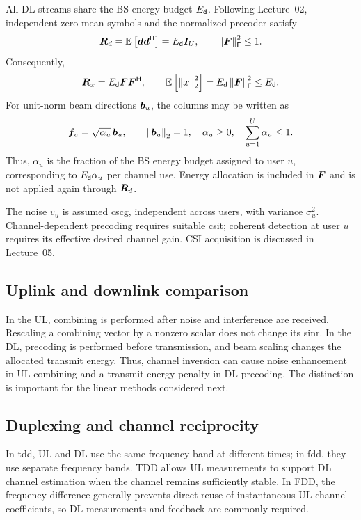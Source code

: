 All DL streams share the BS energy budget $E_{\mathsf{d}}$. Following Lecture~02, independent zero-mean symbols and the normalized precoder satisfy
\begin{equation}
	\bm{R}_d=\mathbb{E}\left[\bm{d}{\bm{d}}^{\mathsf{H}}\right]=E_{\mathsf{d}}\bm{I}_U,
	\qquad \left\|\bm{F}\right\|_{\mathsf{F}}^2\leq1.
	\label{eq:dlconstraint}
\end{equation}
Consequently,
\begin{equation}
	\bm{R}_x=E_{\mathsf{d}}\bm{F}{\bm{F}}^{\mathsf{H}},\qquad
	\mathbb{E}\left[\left\|\bm{x}\right\|_2^2\right]=E_{\mathsf{d}}\left\|\bm{F}\right\|_{\mathsf{F}}^2\leq E_{\mathsf{d}}.
	\label{eq:dlenergy}
\end{equation}
For unit-norm beam directions $\bm{b}_u$, the columns may be written as
\begin{equation}
	\bm{f}_u=\sqrt{\alpha_u}\,\bm{b}_u,\qquad
	\left\|\bm{b}_u\right\|_2=1,\quad \alpha_u\geq0,\quad
	\sum_{u=1}^{U}\alpha_u\leq1.
	\label{eq:beamenergy}
\end{equation}
Thus, $\alpha_u$ is the fraction of the BS energy budget assigned to user $u$, corresponding to $E_{\mathsf{d}}\alpha_u$ per channel use. Energy allocation is included in $\bm{F}$ and is not applied again through $\bm{R}_d$.

The noise $v_u$ is assumed \ac{cscg}, independent across users, with variance $\sigma_u^2$. Channel-dependent precoding requires suitable \ac{csit}; coherent detection at user $u$ requires its effective desired channel gain. CSI acquisition is discussed in Lecture~05.

\subsection{Uplink and downlink comparison}
In the UL, combining is performed after noise and interference are received. Rescaling a combining vector by a nonzero scalar does not change its \ac{sinr}. In the DL, precoding is performed before transmission, and beam scaling changes the allocated transmit energy. Thus, channel inversion can cause noise enhancement in UL combining and a transmit-energy penalty in DL precoding. The distinction is important for the linear methods considered next.

\subsection{Duplexing and channel reciprocity}
In \ac{tdd}, UL and DL use the same frequency band at different times; in \ac{fdd}, they use separate frequency bands. TDD allows UL measurements to support DL channel estimation when the channel remains sufficiently stable. In FDD, the frequency difference generally prevents direct reuse of instantaneous UL channel coefficients, so DL measurements and feedback are commonly required.


